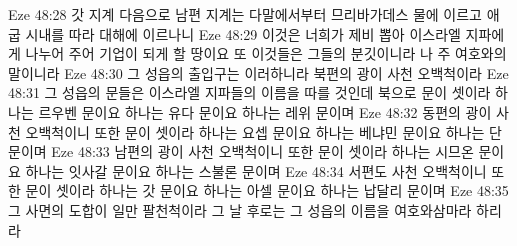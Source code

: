Eze 48:28  갓 지계 다음으로 남편 지계는 다말에서부터 므리바가데스 물에 이르고 애굽 시내를 따라 대해에 이르나니
Eze 48:29  이것은 너희가 제비 뽑아 이스라엘 지파에게 나누어 주어 기업이 되게 할 땅이요 또 이것들은 그들의 분깃이니라 나 주 여호와의 말이니라
Eze 48:30  그 성읍의 출입구는 이러하니라 북편의 광이 사천 오백척이라
Eze 48:31  그 성읍의 문들은 이스라엘 지파들의 이름을 따를 것인데 북으로 문이 셋이라 하나는 르우벤 문이요 하나는 유다 문이요 하나는 레위 문이며
Eze 48:32  동편의 광이 사천 오백척이니 또한 문이 셋이라 하나는 요셉 문이요 하나는 베냐민 문이요 하나는 단 문이며
Eze 48:33  남편의 광이 사천 오백척이니 또한 문이 셋이라 하나는 시므온 문이요 하나는 잇사갈 문이요 하나는 스불론 문이며
Eze 48:34  서편도 사천 오백척이니 또한 문이 셋이라 하나는 갓 문이요 하나는 아셀 문이요 하나는 납달리 문이며
Eze 48:35  그 사면의 도합이 일만 팔천척이라 그 날 후로는 그 성읍의 이름을 여호와삼마라 하리라


